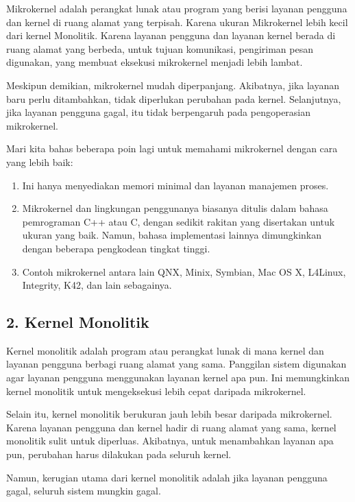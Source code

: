 Mikrokernel adalah perangkat lunak atau program yang berisi layanan pengguna dan kernel di ruang alamat yang terpisah. Karena ukuran Mikrokernel lebih kecil dari kernel Monolitik. Karena layanan pengguna dan layanan kernel berada di ruang alamat yang berbeda, untuk tujuan komunikasi, pengiriman pesan digunakan, yang membuat eksekusi mikrokernel menjadi lebih lambat.

Meskipun demikian, mikrokernel mudah diperpanjang. Akibatnya, jika layanan baru perlu ditambahkan, tidak diperlukan perubahan pada kernel. Selanjutnya, jika layanan pengguna gagal, itu tidak berpengaruh pada pengoperasian mikrokernel.

Mari kita bahas beberapa poin lagi untuk memahami mikrokernel dengan cara yang lebih baik: 

\begin{enumerate}
	\item Ini hanya menyediakan memori minimal dan layanan manajemen proses.
	
	\item Mikrokernel dan lingkungan penggunanya biasanya ditulis dalam bahasa pemrograman C++ atau C, dengan sedikit rakitan yang disertakan untuk ukuran yang baik. Namun, bahasa implementasi lainnya dimungkinkan dengan beberapa pengkodean tingkat tinggi.
	
	\item Contoh mikrokernel antara lain QNX, Minix, Symbian, Mac OS X, L4Linux, Integrity, K42, dan lain sebagainya.
\end{enumerate}

\vskip0.5cm

\subsection*{2. Kernel Monolitik}
Kernel monolitik adalah program atau perangkat lunak di mana kernel dan layanan pengguna berbagi ruang alamat yang sama. Panggilan sistem digunakan agar layanan pengguna menggunakan layanan kernel apa pun. Ini memungkinkan kernel monolitik untuk mengeksekusi lebih cepat daripada mikrokernel.

Selain itu, kernel monolitik berukuran jauh lebih besar daripada mikrokernel. Karena layanan pengguna dan kernel hadir di ruang alamat yang sama, kernel monolitik sulit untuk diperluas. Akibatnya, untuk menambahkan layanan apa pun, perubahan harus dilakukan pada seluruh kernel.

Namun, kerugian utama dari kernel monolitik adalah jika layanan pengguna gagal, seluruh sistem mungkin gagal.

